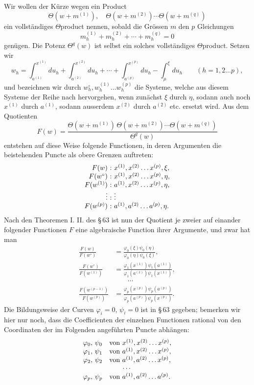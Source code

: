 \documentclass[10pt]{article}
\begin{document}
Wir wollen der Kürze wegen ein Product
\[
\Theta(w+m^{(1)}),\quad \Theta(w+m^{(2)})\cdots \Theta(w+m^{(q)})
\]
ein vollständiges \(\Theta\)product nennen, sobald die Grössen \(m\) den \(p\) Gleichungen
\[
m_h^{(1)}+m_h^{(2)}+\cdots+m_h^{(q)}=0
\]
genügen. Die Potenz \(\Theta^q(w)\) ist selbst ein solches vollständiges \(\Theta\)product. Setzen wir
\[
w_h=\int_{a^{(1)}}^{x^{(1)}}du_h+
\int_{a^{(2)}}^{x^{(2)}}du_h+\cdots+
\int_{a^{(p)}}^{x^{(p)}}du_h-
\int_{\mu}^{\xi}du_h\qquad(h=1,2\ldots p),
\]
und bezeichnen wir durch \(w_h^\circ,w_h^{(1)}\ldots w_h^{(p)}\) die Systeme, welche aus diesem Systeme der Reihe nach hervorgehen, wenn zunächst \(\xi\) durch \(\eta\), sodann auch noch \(x^{(1)}\) durch \(a^{(1)}\), sodann ausserdem \(x^{(2)}\) durch \(a^{(2)}\) etc. ersetzt wird. Aus dem Quotienten
\[
F(w)=\frac{\Theta(w+m^{(1)})\,\Theta(w+m^{(2)})\cdots\Theta(w+m^{(q)})}{\Theta^q(w)}
\]
entstehen auf diese Weise folgende Functionen, in deren Argumenten die beistehenden Puncte als obere Grenzen auftreten:
\[
\begin{array}{r@{\ :\ }l}
F(w)&x^{(1)},x^{(2)}\ldots x^{(p)},\xi,\\
F(w^\circ)&x^{(1)},x^{(2)}\ldots x^{(p)},\eta,\\
F(w^{(1)})&a^{(1)},x^{(2)}\ldots x^{(p)},\eta,\\
\vdots&\vdots\\
F(w^{(p)})&a^{(1)},a^{(2)}\ldots a^{(p)},\eta.
\end{array}
\]
Nach den Theoremen I. II. des \S\,63 ist nun der Quotient je zweier auf einander folgender Functionen \(F\) eine algebraische Function ihrer Argumente, und zwar hat man
\[
\tag{1}
\begin{aligned}
\frac{F(w)}{F(w^\circ)}&=\frac{\varphi_0(\xi)\psi_0(\eta)}{\varphi_0(\eta)\psi_0(\xi)},\\
\frac{F(w^\circ)}{F(w^{(1)})}&=\frac{\varphi_1(x^{(1)})\psi_1(a^{(1)})}{\varphi_1(a^{(1)})\psi_1(x^{(1)})},\\
&\hspace{2em}\cdots\\
\frac{F(w^{(p-1)})}{F(w^{(p)})}&=\frac{\varphi_p(x^{(p)})\psi_p(a^{(p)})}{\varphi_p(a^{(p)})\psi_p(x^{(p)})}.
\end{aligned}
\]
Die Bildungsweise der Curven \(\varphi_i=0\), \(\psi_i=0\) ist in \S\,63 gegeben; bemerken wir hier nur noch, dass die Coefficienten der einzelnen Functionen rational von den Coordinaten der im Folgenden angeführten Puncte abhängen:
\[
\begin{array}{r@{,\ }l@{\quad}l}
\varphi_0&\psi_0&\text{von }x^{(1)},x^{(2)}\ldots x^{(p)},\\
\varphi_1&\psi_1&\text{von }a^{(1)},x^{(2)}\ldots x^{(p)},\\
\varphi_2&\psi_2&\text{von }a^{(1)},a^{(2)}\ldots x^{(p)},\\
\multicolumn{3}{c}{\cdots}\\
\varphi_p&\psi_p&\text{von }a^{(1)},a^{(2)}\ldots a^{(p)}.
\end{array}
\]
\end{document}
